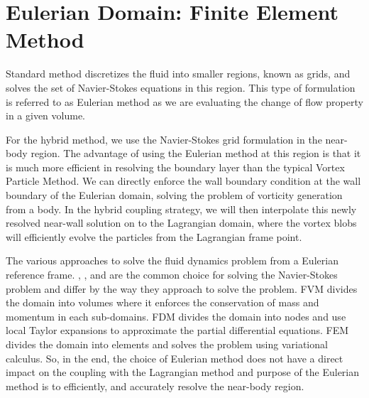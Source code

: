 \chapter{Eulerian Domain: Finite Element Method}

	

Standard  method discretizes the fluid into smaller regions, known as grids, and solves the set of Navier-Stokes equations in this region. This type of formulation is referred to as Eulerian method as we are evaluating the change of flow property in a given volume.

For the hybrid method, we use the Navier-Stokes grid formulation in the near-body region. The advantage of using the Eulerian method at this region is that it is much more efficient in resolving the boundary layer than the typical Vortex Particle Method. We can directly enforce the wall boundary condition at the wall boundary of the Eulerian domain, solving the problem of vorticity generation from a body. In the hybrid coupling strategy, we will then interpolate this newly resolved near-wall solution on to the Lagrangian domain, where the vortex blobs will efficiently evolve the particles from the Lagrangian frame point.

The various approaches to solve the fluid dynamics problem from a Eulerian reference frame. , , and  are the common choice for solving the Navier-Stokes problem and differ by the way they approach to solve the problem. FVM divides the domain into volumes where it enforces the conservation of mass and momentum in each sub-domains. FDM divides the domain into nodes and use local Taylor expansions to approximate the partial differential equations. FEM divides the domain into elements and solves the problem using variational calculus. So, in the end, the choice of Eulerian method does not have a direct impact on the coupling with the Lagrangian method and purpose of the Eulerian method is to efficiently, and accurately resolve the near-body region.

